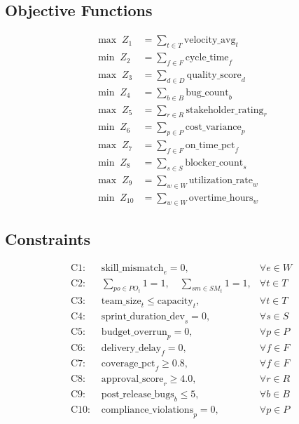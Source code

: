 \documentclass{article}
\begin{document}
\subsection*{Objective Functions}
\begin{align*}
\max\; Z_1 &= \sum_{t \in T} \mathrm{velocity\_avg}_t\\
\min\; Z_2 &= \sum_{f \in F} \mathrm{cycle\_time}_f\\
\max\; Z_3 &= \sum_{d \in D} \mathrm{quality\_score}_d\\
\min\; Z_4 &= \sum_{b \in B} \mathrm{bug\_count}_b\\
\max\; Z_5 &= \sum_{r \in R} \mathrm{stakeholder\_rating}_r\\
\min\; Z_6 &= \sum_{p \in P} \mathrm{cost\_variance}_p\\
\max\; Z_7 &= \sum_{f \in F} \mathrm{on\_time\_pct}_f\\
\min\; Z_8 &= \sum_{s \in S} \mathrm{blocker\_count}_s\\
\max\; Z_9 &= \sum_{w \in W} \mathrm{utilization\_rate}_w\\
\min\; Z_{10} &= \sum_{w \in W} \mathrm{overtime\_hours}_w
\end{align*}

\subsection*{Constraints}
\begin{align*}
\text{C1: } & \mathrm{skill\_mismatch}_e = 0, &\forall e \in W\\
\text{C2: } & \sum_{po \in PO_t} 1 = 1,\quad \sum_{sm \in SM_t} 1 = 1, &\forall t \in T\\
\text{C3: } & \mathrm{team\_size}_t \le \mathrm{capacity}_t, &\forall t \in T\\
\text{C4: } & \mathrm{sprint\_duration\_dev}_s = 0, &\forall s \in S\\
\text{C5: } & \mathrm{budget\_overrun}_p = 0, &\forall p \in P\\
\text{C6: } & \mathrm{delivery\_delay}_f = 0, &\forall f \in F\\
\text{C7: } & \mathrm{coverage\_pct}_f \ge 0.8, &\forall f \in F\\
\text{C8: } & \mathrm{approval\_score}_r \ge 4.0, &\forall r \in R\\
\text{C9: } & \mathrm{post\_release\_bugs}_b \le 5, &\forall b \in B\\
\text{C10: } & \mathrm{compliance\_violations}_p = 0, &\forall p \in P
\end{align*}
\end{document}
